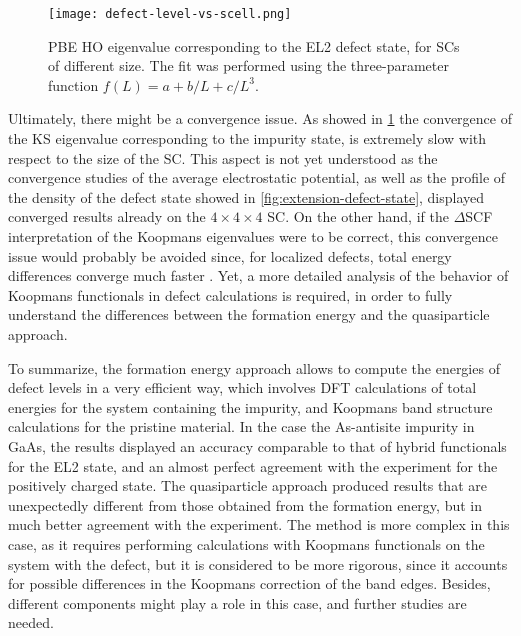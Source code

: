 \begin{figure}
    \centering
    \texttt{[image: defect-level-vs-scell.png]}
    \caption[Convergence study of the defect KS eigenvalue]{PBE HO eigenvalue corresponding to the EL2 defect state, for SCs of different size. The fit was performed using the three-parameter function $f(L) = a + b/L + c/L^3$.}
    \label{fig:convergence-ks-eig-defect}
\end{figure}

Ultimately, there might be a convergence issue. As showed in \cref{fig:convergence-ks-eig-defect} the convergence of the KS eigenvalue corresponding to the impurity state, is extremely slow with respect to the size of the SC. This aspect is not yet understood as the convergence studies of the average electrostatic potential, as well as the profile of the density of the defect state showed in \cref{fig:extension-defect-state}, displayed converged results already on the $4\times 4 \times 4$ SC. On the other hand, if the $\Delta$SCF interpretation of the Koopmans eigenvalues were to be correct, this convergence issue would probably be avoided since, for localized defects, total energy differences converge much faster \cite{komsa_assessing_2011}. Yet, a more detailed analysis of the behavior of Koopmans functionals in defect calculations is required, in order to fully understand the differences between the formation energy and the quasiparticle approach.

To summarize, the formation energy approach allows to compute the energies of defect levels in a very efficient way, which involves DFT calculations of total energies for the system containing the impurity, and Koopmans band structure calculations for the pristine material. In the case the As-antisite impurity in GaAs, the results displayed an accuracy comparable to that of hybrid functionals for the EL2 state, and an almost perfect agreement with the experiment for the positively charged state. The quasiparticle approach produced results that are unexpectedly different from those obtained from the formation energy, but in much better agreement with the experiment. The method is more complex in this case, as it requires performing calculations with Koopmans functionals on the system with the defect, but it is considered to be more rigorous, since it accounts for possible differences in the Koopmans correction of the band edges. Besides, different components might play a role in this case, and further studies are needed.


